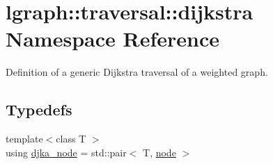\hypertarget{namespacelgraph_1_1traversal_1_1dijkstra}{\section{lgraph\-:\-:traversal\-:\-:dijkstra Namespace Reference}
\label{namespacelgraph_1_1traversal_1_1dijkstra}
}


Definition of a generic Dijkstra traversal of a weighted graph.  


\subsection*{Typedefs}
\begin{DoxyCompactItemize}
\item 
\hypertarget{namespacelgraph_1_1traversal_1_1dijkstra_ab54520d6f8049c8841128742624904a3}{{\footnotesize template$<$class T $>$ }\\using \hyperlink{namespacelgraph_1_1traversal_1_1dijkstra_ab54520d6f8049c8841128742624904a3}{djka\-\_\-node} = std\-::pair$<$ T, \hyperlink{namespacelgraph_a397169dd66adf725210a30fb7251773e}{node} $>$}\label{namespacelgraph_1_1traversal_1_1dijkstra_ab54520d6f8049c8841128742624904a3}


\end{DoxyCompactItemize}
